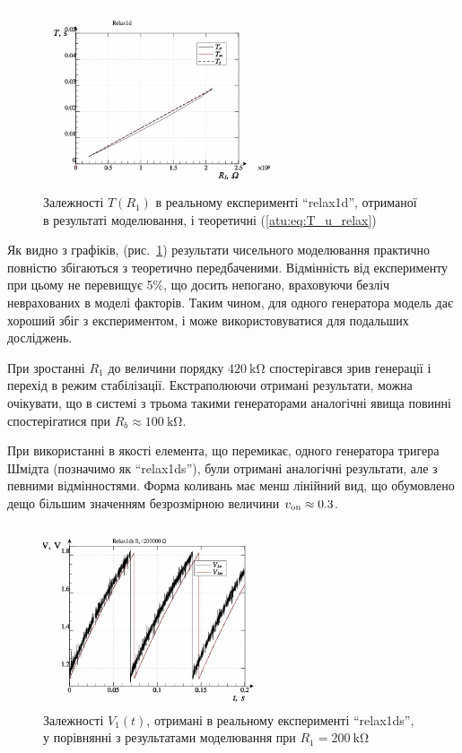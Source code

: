 \begin{figure}[htb!]
  \centerline{\includegraphics[width=0.6\textwidth]{p/relax1d_read_cmp-p_R1_T.png} }
\caption{Залежності $ T (R_1) $ в реальному експерименті ``relax1d'', отриманої в результаті моделювання, і теоретичні (\ref{atu:eq:T_u_relax})}
\label{atu:f:relax1d_read_cmp-p_R1_T}
\end{figure}


Як видно з графіків, (рис.~\ref{atu:f:relax1d_read_cmp-p_R1_T}) результати
чисельного моделювання практично повністю збігаються з
теоретично передбаченими. Відмінність від експерименту при
цьому не перевищує 5\%, що досить непогано, враховуючи безліч
неврахованих в моделі факторів. Таким чином, для одного
генератора модель дає хороший збіг з експериментом, і може
використовуватися для подальших досліджень.

При зростанні
$R_1 $ до величини порядку
$\SI{420}{\kilo \ohm} $ спостерігався зрив генерації і перехід в
режим стабілізації. Екстраполюючи отримані результати, можна
очікувати, що в системі з трьома такими генераторами аналогічні
явища повинні спостерігатися при
$R_b \approx \SI{100}{\kilo \ohm} $.

При використанні в якості елемента, що перемикає, одного
генератора тригера Шмідта (позначимо як ``relax1ds''), були отримані
аналогічні результати, але з певними відмінностями. Форма
коливань має менш лінійний вид, що обумовлено дещо більшим
значенням безрозмірною величини
$v _\mathrm{on} \approx 0.3 $.

\begin{figure}[htb!]
  \centerline{\includegraphics[width=0.6\textwidth]{p/relax1ds_read_cmp-p_t_r1=200k.png} }
\caption{Залежності $V_1(t)$, отримані в реальному експерименті ``relax1ds'', у порівнянні з результатами моделювання при $ R_1 = \SI{200}{\kilo \ohm} $}
\label{atu:f:relax1ds_read_cmp-p_t_r1}
\end{figure}

